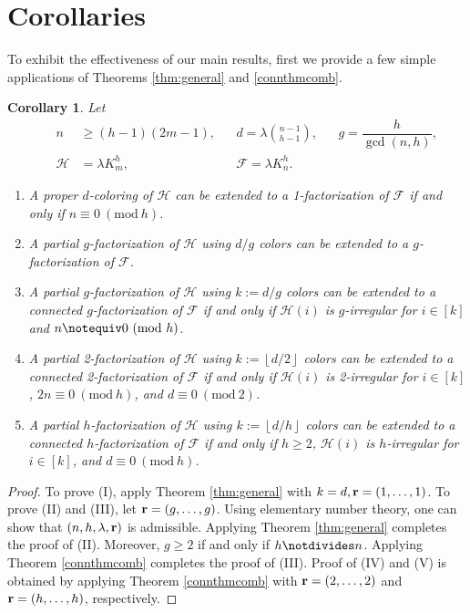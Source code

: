 \documentclass[12pt,oneside]{amsart}
\newtheorem{corollary}[theorem]{Corollary}
\newcommand{\Mod}[1]{\ (\mathrm{mod}\ #1)}
\newcommand{\cc}{\mathcal}
\newcommand\rounddown[1]{\left\lfloor#1\right\rfloor}
\begin{document}
\section{Corollaries}
To exhibit the effectiveness of our main results, first we provide a few simple applications of Theorems \ref{thm:general} and \ref{connthmcomb}. 

\begin{corollary}
Let 
\begin{align*}
    && n &\geq (h-1)(2m-1), &&  d=\lambda \binom{n-1}{h-1}, && g=\dfrac{h}{\gcd(n,h)},\\
     &&  \cc H&=\lambda K_m^h, && \cc F= \lambda K_n^h.
\end{align*}
\begin{enumerate}[label=\textup{(\Roman*)}]
    \item A proper $d$-coloring of $\cc H$  can be extended to a 1-factorization of $\cc F$ if and only if $n \equiv 0 \Mod h$.
    \item A partial $g$-factorization of $\cc H$ using $d/g$ colors can be extended to a  $g$-factorization of $\cc F$.
    \item A partial $g$-factorization of $\cc H$ using $k:=d/g$ colors can be extended to a connected $g$-factorization of $\cc F$ if and only if  $\cc H(i)$ is $g$-irregular for $i\in [k]$ and  $n \notequiv 0 \Mod h$.
    \item A partial 2-factorization of $\cc H$ using $k:=\rounddown{d/2}$ colors can be extended to a connected 2-factorization of $\cc F$ if and only if  $\cc H(i)$ is 2-irregular for $i\in [k]$, $2n \equiv 0 \Mod h$, and  $d \equiv 0 \Mod 2$.
    \item A partial $h$-factorization of $\cc H$ using $k:=\rounddown{d/h}$ colors can be extended to a connected $h$-factorization of $\cc F$ if and only if  $h\geq 2$, $\cc H(i)$ is $h$-irregular for $i\in [k]$, and  $d \equiv 0 \Mod h$.
   \end{enumerate}
\end{corollary}
\begin{proof}
To prove  (I), apply Theorem \ref{thm:general} with $k=d, \vb{r}=(1,\dots, 1)$. To prove (II) and (III), let $\vb{r}=(g,\dots,g)$. Using elementary number theory, one can show that $(n,h,\lambda, \vb{r})$ is admissible. Applying Theorem \ref{thm:general} completes the proof of (II). Moreover, $g\geq 2$ if and only if $h\notdivides n$. Applying Theorem \ref{connthmcomb} completes the proof of (III). Proof of (IV) and (V) is obtained by applying Theorem \ref{connthmcomb}  with $\vb{r}=(2,\dots,2)$ and $\vb{r}=(h,\dots,h)$, respectively. 
\end{proof}
\end{document}
